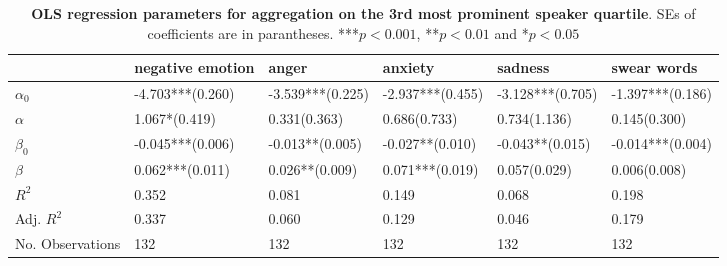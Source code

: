 \begin{table}[h]\centering
\caption{\textbf{OLS regression parameters for aggregation on the 3rd most prominent speaker quartile}. SEs of coefficients are in parantheses. ***$p < 0.001$, **$p < 0.01$ and *$p < 0.05$}
	\label{fig: Verbosity_5}
\begin{adjustbox}{width=\linewidth, center}
	\begin{tabular}{llllll}
	\toprule
	{} &                                negative emotion &                                                     anger &                                                   anxiety &                                                   sadness &                                               swear words \\
	\midrule
	$\alpha_0$       &                                -4.703***(0.260) &                                          -3.539***(0.225) &                                          -2.937***(0.455) &                                          -3.128***(0.705) &                                          -1.397***(0.186) \\
	$\alpha$         &  \phantom{-}1.067*\phantom{*}\phantom{*}(0.419) &  \phantom{-}0.331\phantom{*}\phantom{*}\phantom{*}(0.363) &  \phantom{-}0.686\phantom{*}\phantom{*}\phantom{*}(0.733) &  \phantom{-}0.734\phantom{*}\phantom{*}\phantom{*}(1.136) &  \phantom{-}0.145\phantom{*}\phantom{*}\phantom{*}(0.300) \\
	$\beta_0$        &                                -0.045***(0.006) &                                -0.013**\phantom{*}(0.005) &                                -0.027**\phantom{*}(0.010) &                                -0.043**\phantom{*}(0.015) &                                          -0.014***(0.004) \\
	$\beta$          &                      \phantom{-}0.062***(0.011) &                      \phantom{-}0.026**\phantom{*}(0.009) &                                \phantom{-}0.071***(0.019) &  \phantom{-}0.057\phantom{*}\phantom{*}\phantom{*}(0.029) &  \phantom{-}0.006\phantom{*}\phantom{*}\phantom{*}(0.008) \\
	$R^2$            &                                           0.352 &                                                     0.081 &                                                     0.149 &                                                     0.068 &                                                     0.198 \\
	Adj. $R^2$       &                                           0.337 &                                                     0.060 &                                                     0.129 &                                                     0.046 &                                                     0.179 \\
	No. Observations &                                             132 &                                                       132 &                                                       132 &                                                       132 &                                                       132 \\
	\bottomrule
	\end{tabular}
	

\end{adjustbox}
\end{table}
